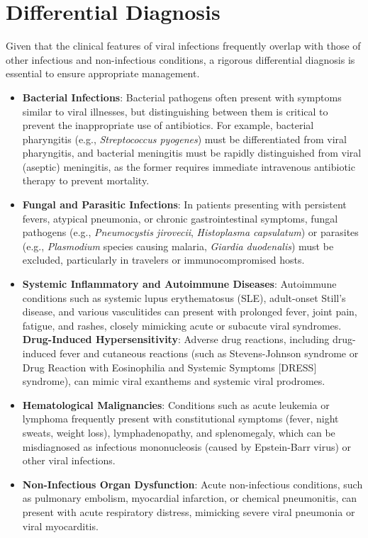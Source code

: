 \section*{Differential Diagnosis}
Given that the clinical features of viral infections frequently overlap with those of other infectious and non-infectious conditions, a rigorous differential diagnosis is essential to ensure appropriate management.
\begin{itemize}
    \item \textbf{Bacterial Infections}: Bacterial pathogens often present with symptoms similar to viral illnesses, but distinguishing between them is critical to prevent the inappropriate use of antibiotics. For example, bacterial pharyngitis (e.g., \textit{Streptococcus pyogenes}) must be differentiated from viral pharyngitis, and bacterial meningitis must be rapidly distinguished from viral (aseptic) meningitis, as the former requires immediate intravenous antibiotic therapy to prevent mortality.
    \item \textbf{Fungal and Parasitic Infections}: In patients presenting with persistent fevers, atypical pneumonia, or chronic gastrointestinal symptoms, fungal pathogens (e.g., \textit{Pneumocystis jirovecii}, \textit{Histoplasma capsulatum}) or parasites (e.g., \textit{Plasmodium} species causing malaria, \textit{Giardia duodenalis}) must be excluded, particularly in travelers or immunocompromised hosts.
    \item \textbf{Systemic Inflammatory and Autoimmune Diseases}: Autoimmune conditions such as systemic lupus erythematosus (SLE), adult-onset Still's disease, and various vasculitides can present with prolonged fever, joint pain, fatigue, and rashes, closely mimicking acute or subacute viral syndromes.
    \textbf{Drug-Induced Hypersensitivity}: Adverse drug reactions, including drug-induced fever and cutaneous reactions (such as Stevens-Johnson syndrome or Drug Reaction with Eosinophilia and Systemic Symptoms [DRESS] syndrome), can mimic viral exanthems and systemic viral prodromes.
    \item \textbf{Hematological Malignancies}: Conditions such as acute leukemia or lymphoma frequently present with constitutional symptoms (fever, night sweats, weight loss), lymphadenopathy, and splenomegaly, which can be misdiagnosed as infectious mononucleosis (caused by Epstein-Barr virus) or other viral infections.
    \item \textbf{Non-Infectious Organ Dysfunction}: Acute non-infectious conditions, such as pulmonary embolism, myocardial infarction, or chemical pneumonitis, can present with acute respiratory distress, mimicking severe viral pneumonia or viral myocarditis.
\end{itemize}

